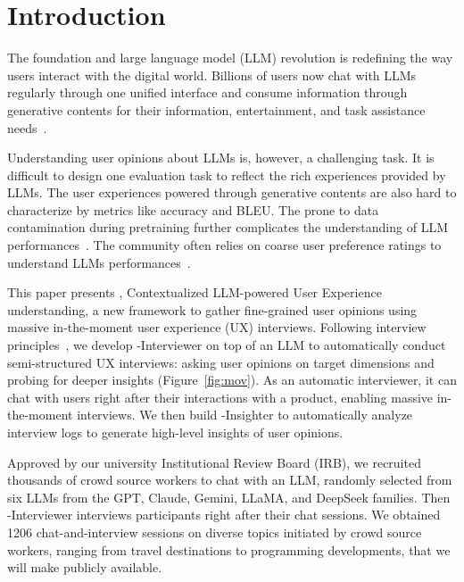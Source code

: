 \section{Introduction}


The foundation and large language model (LLM) revolution is redefining the way users interact with the digital world.
Billions of users now chat with LLMs regularly through one unified interface and consume information through generative contents for their information, entertainment, and task assistance needs~\cite{dailyusers}.





Understanding user opinions about LLMs is, however, a challenging task. 
It is difficult to design one evaluation task to reflect the rich experiences provided by LLMs.
The user experiences powered through generative contents are also hard to characterize by metrics like accuracy and BLEU.
The prone to data contamination during pretraining further complicates the understanding of LLM performances~\cite{schaeffer2023pretraining, singh2024evaluation}. The community often relies on coarse user preference ratings to understand LLMs performances~\cite{chiang2024chatarena}.



This paper presents 
\method{}, Contextualized LLM-powered User Experience understanding, a new framework to gather fine-grained user opinions using massive in-the-moment user experience (UX) interviews.
Following interview principles~\cite{wilson2013interview}, we develop \method-Interviewer on top of an LLM to automatically conduct semi-structured UX interviews: asking user opinions on target dimensions and probing for deeper insights (Figure~\ref{fig:mov}).
As an automatic interviewer, it can chat with users right after their interactions with a product, enabling massive in-the-moment interviews.
We then build \method-Insighter to automatically analyze \method{} interview logs to generate high-level insights of user opinions.



Approved by our university Institutional Review Board (IRB), we recruited thousands of crowd source workers to chat with an LLM, randomly selected from six LLMs from the GPT, Claude, Gemini, LLaMA, and DeepSeek families. Then \method{}-Interviewer interviews participants right after their chat sessions. We obtained 1206 chat-and-interview sessions on diverse topics initiated by crowd source workers, ranging from travel destinations to programming developments, that we will make publicly available.


